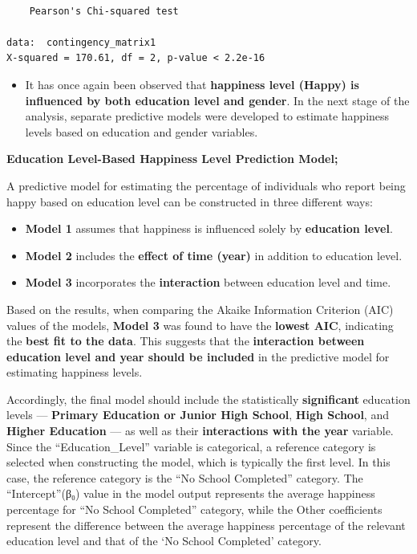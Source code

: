 \documentclass[
  11pt,
  a4paper,
  DIV=11,
  numbers=noendperiod]{scrartcl}
\providecommand{\tightlist}{%
  \setlength{\itemsep}{0pt}\setlength{\parskip}{0pt}}\usepackage{longtable,booktabs,array}
\begin{document}
\begin{verbatim}

    Pearson's Chi-squared test

data:  contingency_matrix1
X-squared = 170.61, df = 2, p-value < 2.2e-16
\end{verbatim}

\begin{itemize}
\tightlist
\item
  It has once again been observed that {\textbf{happiness level (Happy)
  is influenced by both education level and gender}}. In the next stage
  of the analysis, separate predictive models were developed to estimate
  happiness levels based on education and gender variables.
\end{itemize}

\textbf{Education Level-Based Happiness Level Prediction Model;}

A predictive model for estimating the percentage of individuals who
report being happy based on education level can be constructed in three
different ways:

\begin{itemize}
\item
  {\textbf{Model 1}} assumes that happiness is influenced solely by
  {\textbf{education level}}.
\item
  {\textbf{Model 2}} includes the {\textbf{effect of time (year)}} in
  addition to education level.
\item
  {\textbf{Model 3}} incorporates the {\textbf{interaction}} between
  education level and time.
\end{itemize}

Based on the results, when comparing the Akaike Information Criterion
(AIC) values of the models, {\textbf{Model 3}} was found to have the
{\textbf{lowest AIC}}, indicating the {\textbf{best fit to the data}}.
This suggests that the {\textbf{interaction between education level and
year should be included}} in the predictive model for estimating
happiness levels.

Accordingly, the final model should include the statistically
{\textbf{significant}} education levels --- {\textbf{Primary Education
or Junior High School}}, {\textbf{High School}}, and {\textbf{Higher
Education}} --- as well as their {\textbf{interactions with the year}}
variable. Since the ``Education\_Level'' variable is categorical, a
reference category is selected when constructing the model, which is
typically the first level. In this case, the reference category is the
``No School Completed'' category. The ``Intercept''(β₀) value in the
model output represents the average happiness percentage for ``No School
Completed'' category, while the Other coefficients represent the
difference between the average happiness percentage of the relevant
education level and that of the `No School Completed' category.
\end{document}
